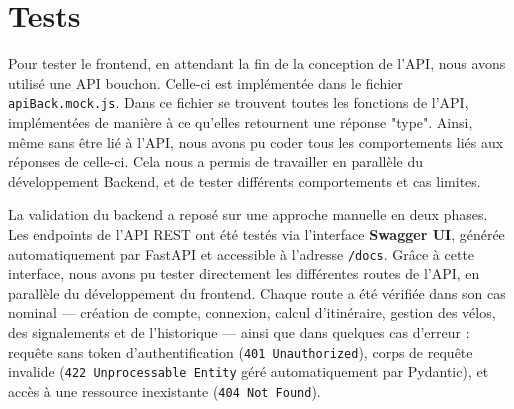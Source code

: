 \section{Tests}
\label{sec:tests}

\noindent Pour tester le frontend, en attendant la fin de la conception de l'API, nous avons utilisé une API bouchon.
Celle-ci est implémentée dans le fichier \texttt{apiBack.mock.js}.
Dans ce fichier se trouvent toutes les fonctions de l'API, implémentées de manière à ce qu'elles retournent une réponse "type".
Ainsi, même sans être lié à l'API, nous avons pu coder tous les comportements liés aux réponses de celle-ci.
Cela nous a permis de travailler en parallèle du développement Backend, et de tester différents comportements et cas limites.

\noindent La validation du backend a reposé sur une approche manuelle en deux phases. Les endpoints de l'API REST ont été 
testés via l'interface \textbf{Swagger UI}, générée automatiquement par FastAPI et accessible à l'adresse \texttt{/docs}. 
Grâce à cette interface, nous avons pu tester directement les différentes routes de l'API, en parallèle du développement du 
frontend. Chaque route a été vérifiée dans son cas nominal — création de compte, connexion, calcul d'itinéraire, gestion des 
vélos, des signalements et de l'historique — ainsi que dans quelques cas d'erreur : requête sans token d'authentification 
(\texttt{401 Unauthorized}), corps de requête invalide (\texttt{422 Unprocessable Entity} géré automatiquement par Pydantic), 
et accès à une ressource inexistante (\texttt{404 Not Found}).